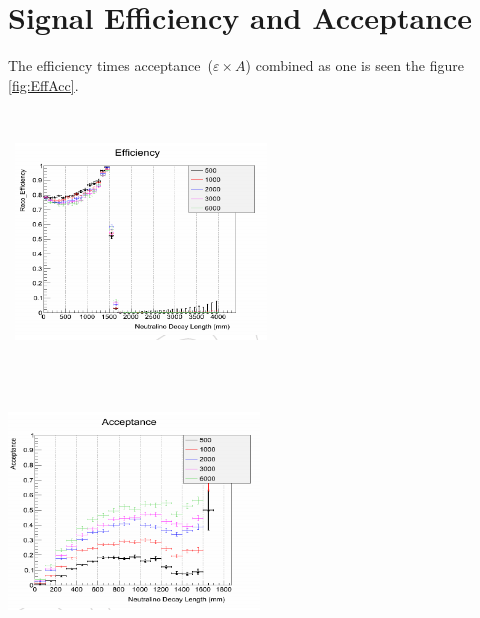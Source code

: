 \section{Signal Efficiency and Acceptance}
The efficiency times acceptance~($\varepsilon \times A$) combined as one is seen the figure \ref{fig:EffAcc}.
\begin{center}
\mbox{
\includegraphics[height=7cm, width=0.5\textwidth]{THESISPLOTS/SignalReconstructionEfficiency.png}
\includegraphics[height=7cm, width=0.5\textwidth]{THESISPLOTS/SignalReconstructionAcceptance.png}
}
\label{fig:EffAcc}
\end{center}


